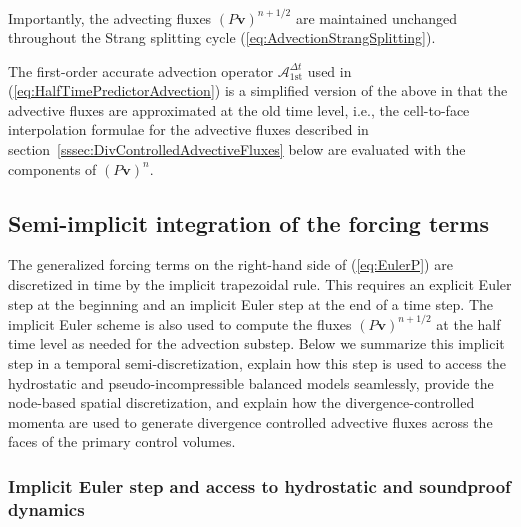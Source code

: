\documentclass{ametsoc}
\theoremstyle{definition}
\newcommand{\eq}[1]{(\ref{#1})}
\newcommand{\vect}[1]{{\mathbf{#1}}}
\newcommand{\vv}{\vect{v}}
\newcommand{\half}{1/2}
\newcommand{\dt}{\Delta t}
\begin{document}
Importantly, the advecting fluxes $(P\vv)^{n+\half}$ are maintained unchanged 
throughout the Strang splitting cycle \eq{eq:AdvectionStrangSplitting}.

The first-order accurate advection operator $\mathcal{A}_{1\text{st}}^{\dt}$
used in \eq{eq:HalfTimePredictorAdvection} is a simplified version
of the above in that the advective fluxes are approximated at the old time level,
i.e., the cell-to-face interpolation formulae for the advective fluxes described
in section~\ref{sssec:DivControlledAdvectiveFluxes} below are evaluated with the
components of $(P\vv)^n$.

\subsection{Semi-implicit integration of the forcing terms}
\label{ssec:SemiImplicitForcing}

The generalized forcing terms on the right-hand side of \eq{eq:EulerP} are 
discretized in time by the implicit trapezoidal rule. This requires an explicit 
Euler step at the beginning and an implicit Euler step at the end of a time step. 
The implicit Euler scheme is also used to compute the fluxes $(P\vv)^{n+\half}$ 
at the half time level as needed for the advection substep. Below we summarize this 
implicit step in a temporal semi-discretization, explain how this step is used
to access the hydrostatic and pseudo-incompressible balanced models seamlessly, 
provide the node-based spatial discretization, and explain how the 
divergence-controlled momenta are used to generate divergence controlled advective 
fluxes across the faces of the primary control volumes.


\subsubsection{Implicit Euler step and access to hydrostatic and soundproof dynamics}
\label{sssec:ImplicitEuler}
\end{document}
